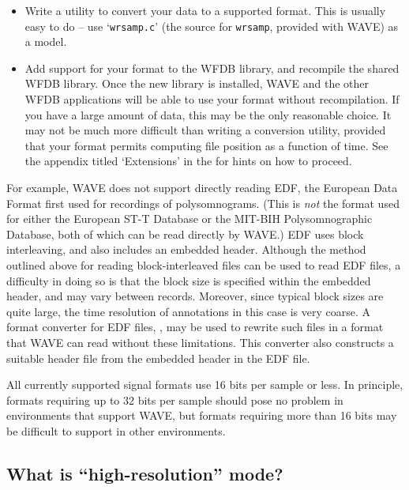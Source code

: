 \documentclass[twoside]{book}
\newcommand{\WAVE}{{\sf WAVE}\xspace}
\begin{document}
\begin{itemize}

\item
Write a utility to convert your data to a supported format.  This is usually
easy to do -- use `{\tt wrsamp.c}' (the source for {\tt wrsamp}, provided with
\WAVE{}) as a model.

\item
Add support for your format to the WFDB library, and recompile the shared WFDB
library.  Once the new library is installed, \WAVE{} and the other WFDB
applications will be able to use your format without recompilation.
If you have a large amount of data, this may be the only reasonable choice.
It may not be much more difficult than writing a conversion utility,
provided that your format permits computing file position as a function of
time.  See the appendix titled `{\sf Extensions}' in the 
for hints on how to proceed.
\end{itemize}

For example, \WAVE{} does not support directly reading EDF, the
European Data Format first used for recordings of
polysomnograms. (This is \emph{not} the format used for either the
European ST-T Database or the MIT-BIH Polysomnographic Database, both
of which can be read directly by \WAVE{}.)  EDF uses block
interleaving, and also includes an embedded header.  Although the
method outlined above for reading block-interleaved files can
be used to read EDF files, a difficulty in doing so is that the block
size is specified within the embedded header, and may vary between
records.  Moreover, since typical block sizes are quite large, the
time resolution of annotations in this case is very coarse.  A format
converter for EDF files,
, may be
used to rewrite such files in a format that \WAVE{} can read without
these limitations.  This converter also constructs a
suitable header file from the embedded header in the EDF file.

All currently supported signal formats use 16 bits per sample or less.
In principle, formats requiring up to 32 bits per sample should pose
no problem in environments that support \WAVE{}, but formats requiring
more than 16 bits may be difficult to support in other environments.

\subsection{What is ``high-resolution'' mode?}
\end{document}
